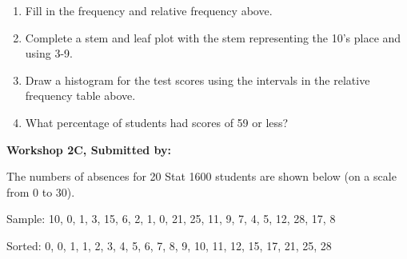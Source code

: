 \documentclass[11pt, chapterprefix=true]{scrbook}\usepackage[]{graphicx}\usepackage[]{color}
\begin{document}
\begin{exercises}
\begin{exercise}
    \end{exercise}
    \begin{solution} %

  \begin{enumerate}
  \item Fill in the frequency and relative frequency above.
  \item	Complete a stem and leaf plot with the stem representing the 10’s place and using 3-9.
  \item Draw a histogram for the test scores using the intervals in the relative frequency table above.
  \item	What percentage of students had scores of 59 or less?
\end{enumerate}

    \end{solution}

\clearpage

    \begin{exercise}  %

    \begin{center}
\begin{flushleft}\textbf{\large \hfill Workshop 2C, Submitted by: }\end{flushleft}

\end{center}

The numbers of absences for 20 Stat 1600 students are shown below (on a scale from 0 to 30).

Sample:	10, 0, 1, 3, 15, 6, 2, 1, 0, 21, 25, 11, 9, 7, 4, 5, 12, 28, 17, 8

Sorted:	0, 0, 1, 1, 2, 3, 4, 5, 6, 7, 8, 9, 10, 11, 12, 15, 17, 21, 25, 28



\end{exercise}
\end{exercises}
\end{document}
